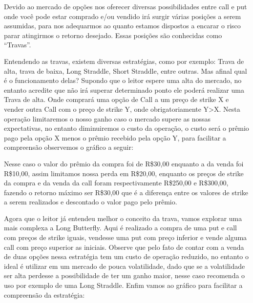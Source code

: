 \documentclass[]{book}
\theoremstyle{definition}
\theoremstyle{definition}
\theoremstyle{definition}
\theoremstyle{remark}
\begin{document}
Devido ao mercado de opções nos oferecer diversas possibilidades entre call e put onde você pode estar comprado e/ou vendido irá surgir várias posições a serem assumidas, para nos adequarmos ao quanto estamos dispostos a encarar o risco parar atingirmos o retorno desejado. Essas posições são conhecidas como ``Travas''.

Entendendo as travas, existem diversas estratégias, como por exemplo: Trava de alta, trava de baixa, Long Straddle, Short Straddle, entre outras. Mas afinal qual é o funcionamento delas? Supondo que o leitor espere uma alta do mercado, no entanto acredite que não irá superar determinado ponto ele poderá realizar uma Trava de alta. Onde comprará uma opção de Call a um preço de strike X e vender outra Call com o preço de strike Y, onde obrigatoriamente Y\textgreater{}X. Nesta operação limitaremos o nosso ganho caso o mercado supere as nossas expectativas, no entanto diminuiremos o custo da operação, o custo será o prêmio pago pela opção X menos o prêmio recebido pela opção Y, para facilitar a compreensão observemos o gráfico a seguir:

Nesse caso o valor do prêmio da compra foi de R\$30,00 enquanto a da venda foi R\$10,00, assim limitamos nossa perda em R\$20,00, enquanto os preços de strike da compra e da venda da call foram respectivamente R\$250,00 e R\$300,00, fazendo o retorno máximo ser R\$30,00 que é a diferença entre os valores de strike a serem realizados e descontado o valor pago pelo prêmio.

Agora que o leitor já entendeu melhor o conceito da trava, vamos explorar uma mais complexa a Long Butterfly. Aqui é realizado a compra de uma put e call com preços de strike iguais, vendesse uma put com preço inferior e vende alguma call com preço superior as iniciais. Observe que pelo fato de contar com a venda de duas opções nessa estratégia tem um custo de operação reduzido, no entanto o ideal é utilizar em um mercado de pouca volatilidade, dado que se a volatilidade ser alta perdesse a possibilidade de ter um ganho maior, nesse caso recomenda o uso por exemplo de uma Long Straddle. Enfim vamos ao gráfico para facilitar a compreensão da estratégia:
\end{document}
